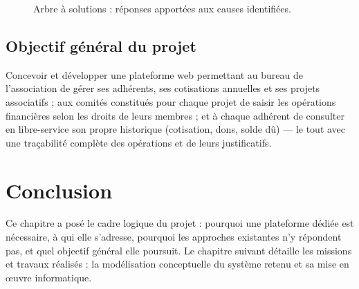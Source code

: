 \begin{figure}[H]
  \centering
  \caption{Arbre à solutions : réponses apportées aux causes identifiées.}
  \label{fig:arbre-solutions}
\end{figure}

\subsection{Objectif général du projet}

Concevoir et développer une plateforme web permettant au bureau de
l'association de gérer ses adhérents, ses cotisations annuelles et ses
projets associatifs ; aux comités constitués pour chaque projet de saisir les
opérations financières selon les droits de leurs membres ; et à chaque
adhérent de consulter en libre-service son propre historique (cotisation,
dons, solde dû) — le tout avec une traçabilité complète des opérations et de
leurs justificatifs.

\section{Conclusion}

Ce chapitre a posé le cadre logique du projet : pourquoi une plateforme
dédiée est nécessaire, à qui elle s'adresse, pourquoi les approches
existantes n'y répondent pas, et quel objectif général elle poursuit. Le
chapitre suivant détaille les missions et travaux réalisés : la modélisation
conceptuelle du système retenu et sa mise en \oe uvre informatique.